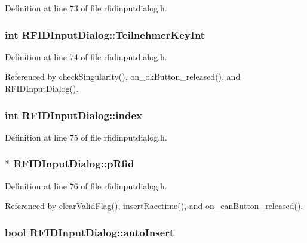 Definition at line 73 of file rfidinputdialog.h.\hypertarget{class_r_f_i_d_input_dialog_557be7292bf8509e793dc17e79d18e75}{
\subsubsection[TeilnehmerKeyInt]{\setlength{\rightskip}{0pt plus 5cm}int {\bf RFIDInputDialog::TeilnehmerKeyInt}}}
\label{class_r_f_i_d_input_dialog_557be7292bf8509e793dc17e79d18e75}




Definition at line 74 of file rfidinputdialog.h.

Referenced by checkSingularity(), on\_\-okButton\_\-released(), and RFIDInputDialog().\hypertarget{class_r_f_i_d_input_dialog_251579065abb62a0421867aafa5b275c}{
\subsubsection[index]{\setlength{\rightskip}{0pt plus 5cm}int {\bf RFIDInputDialog::index}}}
\label{class_r_f_i_d_input_dialog_251579065abb62a0421867aafa5b275c}




Definition at line 75 of file rfidinputdialog.h.\hypertarget{class_r_f_i_d_input_dialog_2fffb8807b878f9debba8d9b13046854}{
\subsubsection[pRfid]{$\ast$ {\bf RFIDInputDialog::pRfid}}}
\label{class_r_f_i_d_input_dialog_2fffb8807b878f9debba8d9b13046854}




Definition at line 76 of file rfidinputdialog.h.

Referenced by clearValidFlag(), insertRacetime(), and on\_\-canButton\_\-released().\hypertarget{class_r_f_i_d_input_dialog_2c4dff3a7602a6bca4d967b5a561942d}{
\subsubsection[autoInsert]{\setlength{\rightskip}{0pt plus 5cm}bool {\bf RFIDInputDialog::autoInsert}}}
\label{class_r_f_i_d_input_dialog_2c4dff3a7602a6bca4d967b5a561942d}




